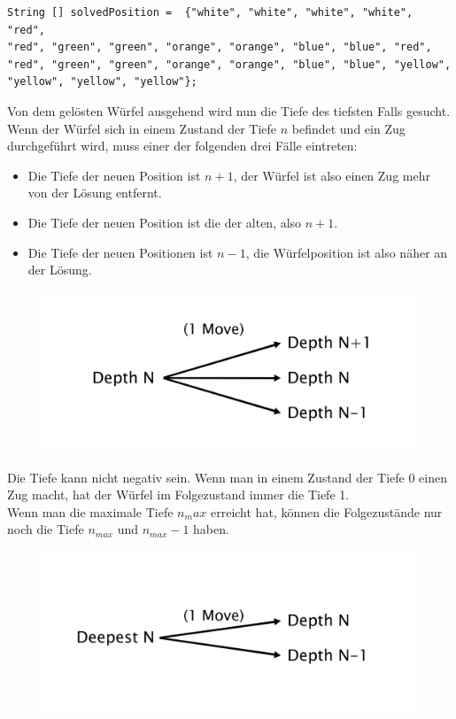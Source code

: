 \documentclass[12pt,a4paper, usenames, dvipsnames]{scrartcl}
\begin{document}
\begin{verbatim}
String [] solvedPosition =  {"white", "white", "white", "white", "red", 
"red", "green", "green", "orange", "orange", "blue", "blue", "red", 
"red", "green", "green", "orange", "orange", "blue", "blue", "yellow", 
"yellow", "yellow", "yellow"};
\end{verbatim}
Von dem gelösten Würfel ausgehend wird nun die Tiefe des tiefsten Falls gesucht. \\
Wenn der Würfel sich in einem Zustand der Tiefe $n$ befindet und ein Zug durchgeführt wird, muss einer der folgenden drei Fälle eintreten:
\begin{itemize}
	\item Die Tiefe der neuen Position ist $n+1$, der Würfel ist also einen Zug mehr von der Lösung entfernt.
	\item Die Tiefe der neuen Position ist die der alten, also $n+1$.
	\item Die Tiefe der neuen Positionen ist $n-1$, die Würfelposition ist also näher an der Lösung.
\end{itemize}
\begin{figure}[h]
\centering
\includegraphics[scale=0.19]{graphDepth.png}
\end{figure}
Die Tiefe kann nicht negativ sein. Wenn man in einem Zustand der Tiefe $0$ einen Zug macht, hat der Würfel im Folgezustand immer die Tiefe 1. \\
Wenn man die maximale Tiefe $n_max$ erreicht hat, können die Folgezustände nur noch die Tiefe $n_{max}$ und $n_{max} -1$ haben. 
\begin{figure}[h]
\centering
\includegraphics[scale=0.2]{graphDepthN.png}
\end{figure}
\end{document}
